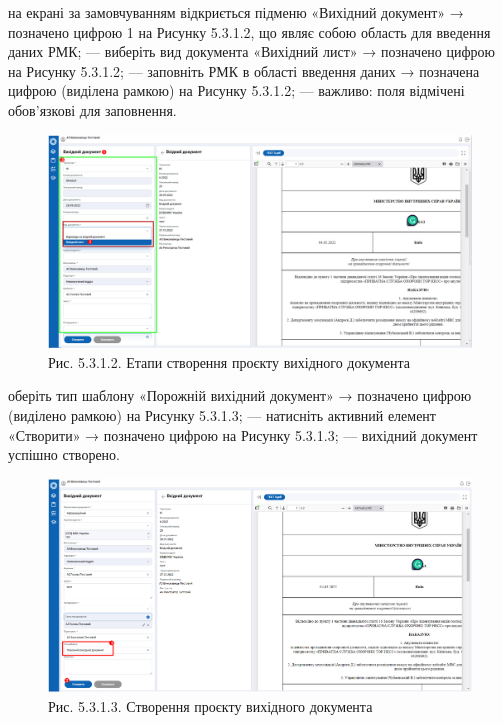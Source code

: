 на екрані за замовчуванням відкриється підменю «Вихідний документ» →
позначено цифрою 1 на Рисунку 5.3.1.2, що являє собою область для введення даних РМК;
--- виберіть вид документа «Вихідний лист» → позначено цифрою  на Рисунку 5.3.1.2;
--- заповніть РМК в області введення даних → позначена цифрою  (виділена рамкою) на Рисунку 5.3.1.2;
--- важливо: поля відмічені \circled{$\ast$} обов’язкові для заповнення.

\begin{figure}[!htbp]
\centerline{\includegraphics[width=\textwidth]{img/5.3.1.2.png}}
\caption{Рис. 5.3.1.2. Етапи створення проєкту вихідного документа}
\end{figure}

оберіть тип шаблону «Порожній вихідний документ» → позначено цифрою  (виділено рамкою) на Рисунку 5.3.1.3;
--- натисніть активний елемент «Створити» → позначено цифрою  на Рисунку 5.3.1.3;
--- вихідний документ успішно створено.

\begin{figure}[!htbp]
\centerline{\includegraphics[width=\textwidth]{img/5.3.1.3.png}}
\caption{Рис. 5.3.1.3. Створення проєкту вихідного документа}
\end{figure}

